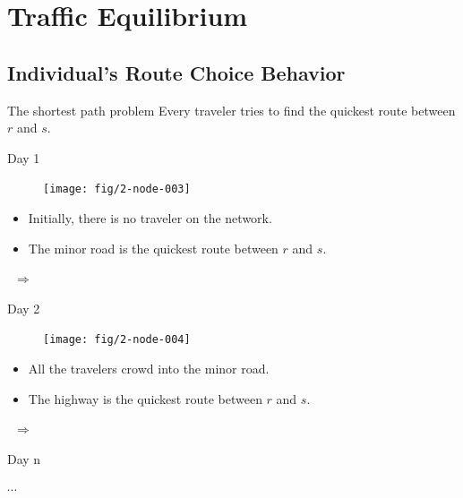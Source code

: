 \documentclass[handout]{beamer}
\begin{document}
\section{Traffic Equilibrium}

\subsection{Individual's Route Choice Behavior}

\begin{frame}{The shortest path problem}
Every traveler tries to find the \alert{quickest route} between $r$ and $s$.\\
\pause
\begin{minipage}{.4\linewidth}
\begin{block}{Day 1}
\begin{figure}
\centering
\texttt{[image: fig/2-node-003]}
\end{figure}
\begin{itemize}
	\item Initially, there is no traveler on the network. 
	\item The \alert{minor road} is the quickest route between $r$ and $s$. 
\end{itemize}
\end{block}
\end{minipage}%
\pause
~$\Rightarrow$~%
\begin{minipage}{.4\linewidth}
\begin{block}{Day 2}
\begin{figure}
\centering
\texttt{[image: fig/2-node-004]}
\end{figure}
\begin{itemize}
	\item All the travelers crowd into the minor road. 
	\item The \alert{highway} is the quickest route between $r$ and $s$.
\end{itemize}
\end{block}
\end{minipage}%
\pause
~$\Rightarrow$~%
\begin{minipage}{.1\linewidth}
\begin{block}{Day n}
\begin{center}
$\cdots$
\end{center}
\end{block}
\end{minipage}
\end{frame}
\end{document}
